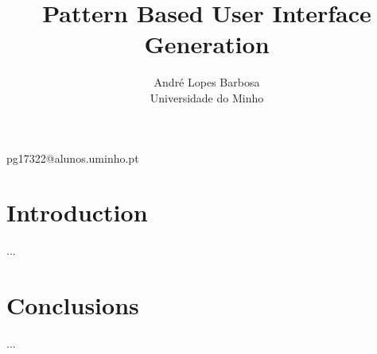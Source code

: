 \documentclass[mistar]{acmtrans2m}
\title{Pattern Based User Interface Generation}
\author{André Lopes Barbosa\\Universidade do Minho}
\begin{document}
\setcounter{page}{1}%

\begin{bottomstuff}
pg17322@alunos.uminho.pt
\end{bottomstuff}

\maketitle

\section{Introduction}
...





\section{Conclusions}
...




\begin{received}
\end{received}
\end{document}
